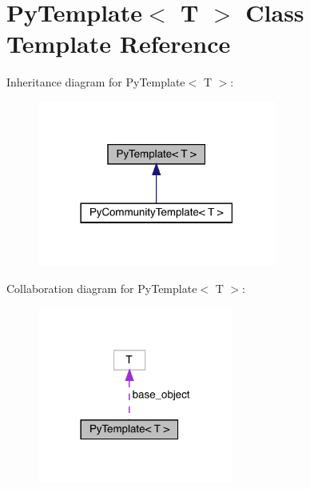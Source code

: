 \hypertarget{class_py_template}{}\section{Py\+Template$<$ T $>$ Class Template Reference}
\label{class_py_template}


Inheritance diagram for Py\+Template$<$ T $>$\+:\nopagebreak
\begin{figure}[H]
\begin{center}
\leavevmode
\includegraphics[width=222pt]{class_py_template__inherit__graph}
\end{center}
\end{figure}


Collaboration diagram for Py\+Template$<$ T $>$\+:\nopagebreak
\begin{figure}[H]
\begin{center}
\leavevmode
\includegraphics[width=182pt]{class_py_template__coll__graph}
\end{center}
\end{figure}
